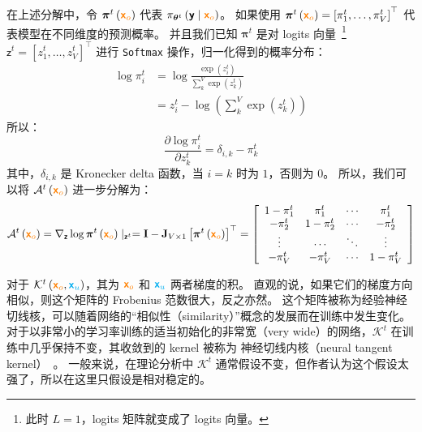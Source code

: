 \documentclass[citestyle=gb7714-2015, bibstyle=gb7714-2015,lang=cn,14pt,scheme=chinese]{elegantbook}
\begin{document}
在上述分解中，令 \(\bm{\pi}^{t} \left( \textcolor{orange}{\bm{\mathsf{x}}_{o}} \right)\) 代表 \(\pi_{\bm{\theta}^{t}} \left( \bm{\mathsf{y}} \mid \textcolor{orange}{\bm{\mathsf{x}}_{o}} \right)\)。
如果使用 \(\bm{\pi}^{t} \left( \textcolor{orange}{\bm{\mathsf{x}}_{o}} \right) = \left[ \pi_{1}^{t}, \dots, \pi_{V}^{t} \right]^{\top}\) 代表模型在不同维度的预测概率。
并且我们已知 \(\bm{\pi}^{t}\) 是对 logits 向量~\footnote{此时 \(L=1\)，logits 矩阵就变成了 logits 向量。} \(\bm{\mathsf{z}}^{t} = \left[ z_{1}^{t}, \dots, z_{V}^{t} \right]^{\top}\) 进行 \texttt{Softmax} 操作，归一化得到的概率分布：
\[
\begin{aligned}
    \log \pi_{i}^{t} &= \log \frac{\exp \left( z_{i}^{t} \right)}{\sum_{k}^{V} \exp \left( z_{k}^{t} \right)} \\
    &= z_{i}^{t} - \log \left( \sum_{k}^{V} \exp \left( z_{k}^{t} \right) \right)
\end{aligned}
\]
所以：
\[
    \frac{\partial \log \pi_{i}^{t}}{\partial z_{k}^{t}} = \delta_{i,k} - \pi_{k}^{t}
\]
其中，\(\delta_{i,k}\) 是 Kronecker delta 函数，当 \(i=k\) 时为 \(1\)，否则为 \(0\)。
所以，我们可以将 \(\mathcal{A}^{t} \left( \textcolor{orange}{\bm{\mathsf{x}}_{o}} \right)\) 进一步分解为：
\begin{equation}
    \mathcal{A}^{t} \left( \textcolor{orange}{\bm{\mathsf{x}}_{o}} \right) = \nabla_{\bm{\mathsf{z}}} \log \bm{\pi}^{t} \left( \textcolor{orange}{\bm{\mathsf{x}}_{o}} \right) \mid_{\bm{\mathsf{z}}^{t}} = \mathbf{I} - \mathbf{J}_{V \times 1} \left[ \bm{\pi}^{t} \left( \textcolor{orange}{\bm{\mathsf{x}}_{o}} \right) \right]^{\top} = 
    \left[            
    \begin{array}{cccc} 
        1 - \pi_{1}^{t} & \pi_{1}^{t} & \cdots & \pi_{1}^{t} \\
        - \pi_{2}^{t} & 1 - \pi_{2}^{t} & \cdots & - \pi_{2}^{t} \\
        \vdots & \cdots & \ddots & \vdots \\
        - \pi_{V}^{t} & - \pi_{V}^{t} & \cdots & 1 - \pi_{V}^{t} \\
    \end{array}
    \right]
\end{equation}

对于 \(\mathcal{K}^{t} \left( \textcolor{orange}{\bm{\mathsf{x}}_{o}}, \textcolor{cyan}{\bm{\mathsf{x}}_{u}} \right)\)，其为 \(\textcolor{orange}{\bm{\mathsf{x}}_{o}}\) 和 \(\textcolor{cyan}{\bm{\mathsf{x}}_{u}}\) 两者梯度的积。
直观的说，如果它们的梯度方向相似，则这个矩阵的 Frobenius 范数很大，反之亦然。
这个矩阵被称为经验神经切线核，可以随着网络的“相似性（similarity）”概念的发展而在训练中发生变化。
对于以非常小的学习率训练的适当初始化的非常宽（very wide）的网络，\(\mathcal{K}^{t}\) 在训练中几乎保持不变，其收敛到的 kernel 被称为 神经切线内核（neural tangent kernel）~\cite{DBLP:conf/nips/AroraDH0SW19,DBLP:conf/nips/JacotHG18}。
一般来说，在理论分析中 \(\mathcal{K}^{t}\) 通常假设不变，但作者认为这个假设太强了，所以在这里只假设是相对稳定的。
\end{document}
